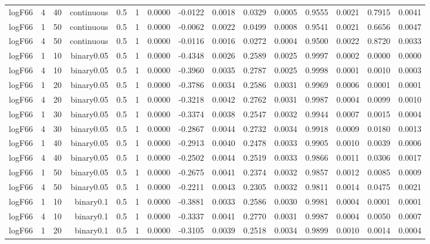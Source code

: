 \begin{longtable}{rrrrrrrrrrrrrrr}
  logF66 & 4 & 40 & continuous & 0.5 & 1 & 0.0000 & -0.0122 & 0.0018 & 0.0329 & 0.0005 & 0.9555 & 0.0021 & 0.7915 & 0.0041 \\ 
  logF66 & 1 & 50 & continuous & 0.5 & 1 & 0.0000 & -0.0062 & 0.0022 & 0.0499 & 0.0008 & 0.9541 & 0.0021 & 0.6656 & 0.0047 \\ 
  logF66 & 4 & 50 & continuous & 0.5 & 1 & 0.0000 & -0.0116 & 0.0016 & 0.0272 & 0.0004 & 0.9500 & 0.0022 & 0.8720 & 0.0033 \\ 
  logF66 & 1 & 10 & binary0.05 & 0.5 & 1 & 0.0000 & -0.4348 & 0.0026 & 0.2589 & 0.0025 & 0.9997 & 0.0002 & 0.0000 & 0.0000 \\ 
  logF66 & 4 & 10 & binary0.05 & 0.5 & 1 & 0.0000 & -0.3960 & 0.0035 & 0.2787 & 0.0025 & 0.9998 & 0.0001 & 0.0010 & 0.0003 \\ 
  logF66 & 1 & 20 & binary0.05 & 0.5 & 1 & 0.0000 & -0.3786 & 0.0034 & 0.2586 & 0.0031 & 0.9969 & 0.0006 & 0.0001 & 0.0001 \\ 
  logF66 & 4 & 20 & binary0.05 & 0.5 & 1 & 0.0000 & -0.3218 & 0.0042 & 0.2762 & 0.0031 & 0.9987 & 0.0004 & 0.0099 & 0.0010 \\ 
  logF66 & 1 & 30 & binary0.05 & 0.5 & 1 & 0.0000 & -0.3374 & 0.0038 & 0.2547 & 0.0032 & 0.9944 & 0.0007 & 0.0015 & 0.0004 \\ 
  logF66 & 4 & 30 & binary0.05 & 0.5 & 1 & 0.0000 & -0.2867 & 0.0044 & 0.2732 & 0.0034 & 0.9918 & 0.0009 & 0.0180 & 0.0013 \\ 
  logF66 & 1 & 40 & binary0.05 & 0.5 & 1 & 0.0000 & -0.2913 & 0.0040 & 0.2478 & 0.0033 & 0.9905 & 0.0010 & 0.0039 & 0.0006 \\ 
  logF66 & 4 & 40 & binary0.05 & 0.5 & 1 & 0.0000 & -0.2502 & 0.0044 & 0.2519 & 0.0033 & 0.9866 & 0.0011 & 0.0306 & 0.0017 \\ 
  logF66 & 1 & 50 & binary0.05 & 0.5 & 1 & 0.0000 & -0.2675 & 0.0041 & 0.2374 & 0.0032 & 0.9857 & 0.0012 & 0.0085 & 0.0009 \\ 
  logF66 & 4 & 50 & binary0.05 & 0.5 & 1 & 0.0000 & -0.2211 & 0.0043 & 0.2305 & 0.0032 & 0.9811 & 0.0014 & 0.0475 & 0.0021 \\ 
  logF66 & 1 & 10 & binary0.1 & 0.5 & 1 & 0.0000 & -0.3881 & 0.0033 & 0.2586 & 0.0030 & 0.9981 & 0.0004 & 0.0001 & 0.0001 \\ 
  logF66 & 4 & 10 & binary0.1 & 0.5 & 1 & 0.0000 & -0.3337 & 0.0041 & 0.2770 & 0.0031 & 0.9987 & 0.0004 & 0.0050 & 0.0007 \\ 
  logF66 & 1 & 20 & binary0.1 & 0.5 & 1 & 0.0000 & -0.3105 & 0.0039 & 0.2518 & 0.0034 & 0.9899 & 0.0010 & 0.0014 & 0.0004 \\ 

\end{longtable}
